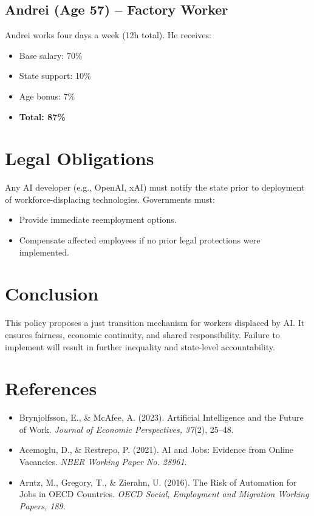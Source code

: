 \documentclass[12pt]{article}
\begin{document}
\subsection{Andrei (Age 57) – Factory Worker}
Andrei works four days a week (12h total). He receives:
\begin{itemize}
  \item Base salary: 70\%
  \item State support: 10\%
  \item Age bonus: 7\%
  \item \textbf{Total: 87\%}
\end{itemize}

\section{Legal Obligations}
Any AI developer (e.g., OpenAI, xAI) must notify the state prior to deployment of workforce-displacing technologies. Governments must:
\begin{itemize}
  \item Provide immediate reemployment options.
  \item Compensate affected employees if no prior legal protections were implemented.
\end{itemize}

\section{Conclusion}
This policy proposes a just transition mechanism for workers displaced by AI. It ensures fairness, economic continuity, and shared responsibility. Failure to implement will result in further inequality and state-level accountability.

\section*{References}
\begin{itemize}
  \item Brynjolfsson, E., \& McAfee, A. (2023). Artificial Intelligence and the Future of Work. \textit{Journal of Economic Perspectives, 37}(2), 25–48.
  \item Acemoglu, D., \& Restrepo, P. (2021). AI and Jobs: Evidence from Online Vacancies. \textit{NBER Working Paper No. 28961}.
  \item Arntz, M., Gregory, T., \& Zierahn, U. (2016). The Risk of Automation for Jobs in OECD Countries. \textit{OECD Social, Employment and Migration Working Papers, 189}.
\end{itemize}
\end{document}
